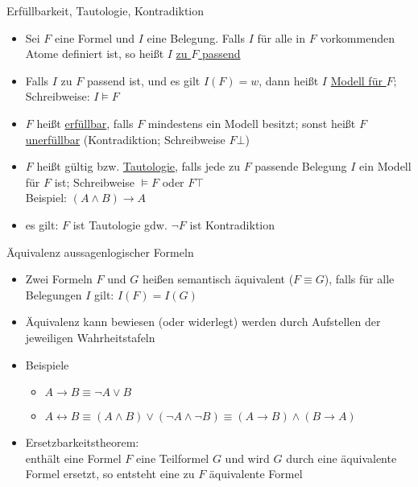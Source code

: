 \begin{frame}{Erfüllbarkeit, Tautologie, Kontradiktion}
	\begin{itemize}
		\item Sei $F$ eine Formel und $I$ eine Belegung. Falls $I$ für alle in $F$ vorkommenden Atome definiert ist, so heißt $I$ \underline{zu $F$ passend}
		\item Falls $I$ zu $F$ passend ist, und es gilt $I(F)=w$, dann heißt $I$ \underline{Modell für $F$}; Schreibweise: $I \models F$
		\item $F$ heißt \underline{erfüllbar}, falls $F$ mindestens ein Modell besitzt; sonst heißt $F$ \underline{unerfüllbar} (Kontradiktion; Schreibweise $F\bot$)
		\item $F$ heißt gültig bzw. \underline{Tautologie}, falls jede zu $F$ passende Belegung $I$ ein Modell für $F$ ist; Schreibweise $\models F$ oder $F\top$ \\
		Beispiel: $(A \land B) \rightarrow A$
		\item es gilt: $F$ ist Tautologie gdw. $\neg F$ ist Kontradiktion
	\end{itemize}
\end{frame}

\begin{frame}{Äquivalenz aussagenlogischer Formeln}
	\begin{itemize}
		\item Zwei Formeln $F$ und $G$ heißen semantisch äquivalent ($F \equiv G$), falls für alle Belegungen $I$ gilt: $I(F)=I(G)$
		\item Äquivalenz kann bewiesen (oder widerlegt) werden durch Aufstellen der jeweiligen Wahrheitstafeln
		\item Beispiele
		\begin{itemize}
			\item $A \rightarrow B \equiv \neg A \lor B$
			\item $A \leftrightarrow B \equiv (A \land B) \lor (\neg A \land \neg B) \equiv (A \rightarrow B) \land (B \rightarrow A)$
		\end{itemize}
		\item Ersetzbarkeitstheorem:\\
		enthält eine Formel $F$ eine Teilformel $G$ und wird $G$ durch eine äquivalente Formel ersetzt, so entsteht eine zu $F$ äquivalente Formel
	\end{itemize}
\end{frame}

